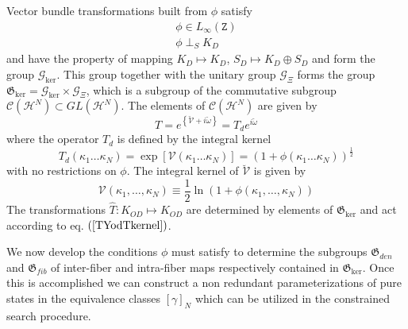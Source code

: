 \documentclass[aps,preprint]{revtex4}%
\begin{document}
Vector bundle transformations built from $\phi$ satisfy
\begin{gather}
\phi\in L_{\infty}(\mathtt{Z})\nonumber\\
\phi\perp_{S}K_{D} \label{phiprop}%
\end{gather}
and have the property of mapping $K_{D}\mapsto K_{D}$, $S_{D}\mapsto
K_{D}\oplus S_{D}$ and form the group $\mathcal{G}_{\ker}$. This group
together with the unitary group $\mathcal{G}_{\Xi}$ forms the group
$\mathfrak{G}_{\ker}=\mathcal{G}_{\ker}\times\mathcal{G}_{\Xi}$, which is a
subgroup of the commutative subgroup $\mathcal{C}(\mathcal{H}^{N})\subset
GL(\mathcal{H}^{N})$. The elements of $\mathcal{C}(\mathcal{H}^{N})$ are given
by
\begin{equation}
T=e^{\left\{  \mathcal{\breve{V}}+i\breve{\omega}\right\}  }=T_{d}%
e^{i\breve{\omega}}%
\end{equation}
where the operator $T_{d}$ is defined by the integral kernel
\begin{equation}
T_{d}(\kappa_{1}\ldots\kappa_{N})=\exp[\mathcal{V}(\kappa_{1}\ldots\kappa
_{N})]=(1+\phi(\kappa_{1}\ldots\kappa_{N}))^{\frac{1}{2}}%
\end{equation}
with no restrictions on $\phi$. The integral kernel of $\mathcal{\breve{V}}$
is given by
\begin{equation}
\mathcal{V}(\kappa_{1},\ldots,\kappa_{N})\equiv\frac{1}{2}\ln(1+\phi
(\kappa_{1},\ldots,\kappa_{N})) \label{Vhalfln}%
\end{equation}
The transformations $\hat{T}:K_{OD}\mapsto K_{OD}$ are determined by elements
of $\mathfrak{G}_{\ker}$ and act according to eq. $\left(  \ref{TYodTkernel}%
\right)  $.

We now develop the conditions $\phi$ must satisfy to determine the subgroups
$\mathfrak{G}_{den}$ and $\mathfrak{G}_{fib}$ of inter-fiber and intra-fiber
maps respectively contained in $\mathfrak{G}_{\ker}$. Once this is
accomplished we can construct a non redundant parameterizations of pure states
in the equivalence classes $\left[  \gamma\right]  _{N}$ which can be utilized
in the constrained search procedure.
\end{document}
